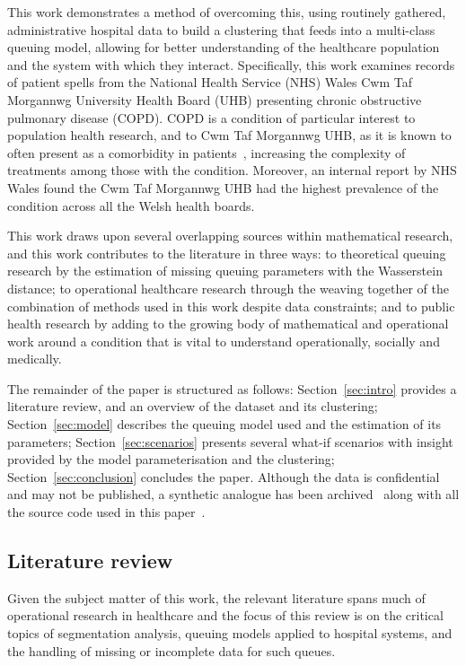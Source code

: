 \documentclass[11pt]{article}
\begin{document}
This work demonstrates a method of overcoming this, using routinely gathered,
administrative hospital data to build a clustering that feeds into a multi-class
queuing model, allowing for better understanding of the healthcare population
and the system with which they interact. Specifically, this work examines
records of patient spells from the National Health Service (NHS) Wales Cwm Taf
Morgannwg University Health Board (UHB) presenting chronic obstructive pulmonary
disease (COPD). COPD is a condition of particular interest to population health
research, and to Cwm Taf Morgannwg UHB, as it is known to often present as a
comorbidity in patients~\cite{Houben2019}, increasing the complexity of
treatments among those with the condition. Moreover, an internal report by NHS
Wales found the Cwm Taf Morgannwg UHB had the highest prevalence of the
condition across all the Welsh health boards.

This work draws upon several overlapping sources within mathematical research,
and this work contributes to the literature in three ways: to theoretical
queuing research by the estimation of missing queuing parameters with the
Wasserstein distance; to operational healthcare research through the weaving
together of the combination of methods used in this work despite data
constraints; and to public health research by adding to the growing body of
mathematical and operational work around a condition that is vital to understand
operationally, socially and medically. 

The remainder of the paper is structured as follows: Section~\ref{sec:intro}
provides a literature review, and an overview of the dataset and its clustering;
Section~\ref{sec:model} describes the queuing model used and the estimation of
its parameters; Section~\ref{sec:scenarios} presents several what-if scenarios
with insight provided by the model parameterisation and the clustering;
Section~\ref{sec:conclusion} concludes the paper. Although the data is
confidential and may not be published, a synthetic analogue has been
archived~\cite{Wilde2020synthetic} along with all the source code used in this
paper~\cite{Wilde2020github}.


\subsection{Literature review}\label{subsec:review}

Given the subject matter of this work, the relevant literature spans much of
operational research in healthcare and the focus of this review is on the
critical topics of segmentation analysis, queuing models applied to hospital
systems, and the handling of missing or incomplete data for such queues.
\end{document}
